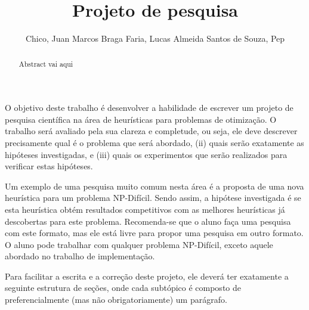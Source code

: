 \documentclass[12pt]{article}
\title{Projeto de pesquisa}
\author{
	Chico\inst{1},
	Juan Marcos Braga Faria\inst{1},
	Lucas Almeida Santos de Souza\inst{1},
	Pep\inst{1}
}
\begin{document}
 

\maketitle

\begin{abstract}
	Abstract vai aqui~\cite{cormen:2009} %
\end{abstract}
     
\begin{resumo}
	O objetivo deste trabalho é desenvolver a habilidade de escrever um projeto de pesquisa científica na área de heurísticas para problemas de otimização. O trabalho será avaliado pela sua clareza e completude, ou seja, ele deve descrever precisamente qual é o problema que será abordado, (ii) quais serão exatamente as hipóteses investigadas, e (iii) quais os experimentos que serão realizados para verificar estas hipóteses. 

	Um exemplo de uma pesquisa muito comum nesta área é a proposta de uma nova heurística para um problema NP-Difícil. Sendo assim, a hipótese investigada é se esta heurística obtém resultados competitivos com as melhores heurísticas já descobertas para este problema. Recomenda-se que o aluno faça uma pesquisa com este formato, mas ele está livre para propor uma pesquisa em outro formato. O aluno pode trabalhar com qualquer problema NP-Difícil, exceto aquele abordado no trabalho de implementação. 

	Para facilitar a escrita e a correção deste projeto, ele deverá ter exatamente a seguinte estrutura de seções, onde cada subtópico é composto de preferencialmente (mas não obrigatoriamente) um parágrafo. 
\end{resumo}















\end{document}
